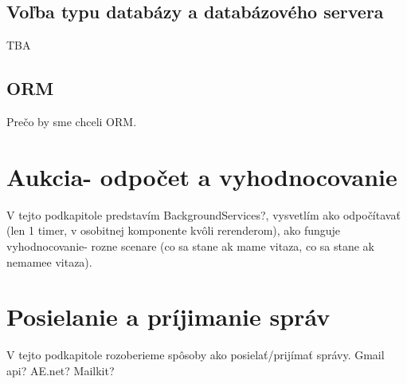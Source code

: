\subsection{Voľba typu databázy a databázového servera}

TBA

\subsection{ORM}

Prečo by sme chceli ORM.

\section{Aukcia- odpočet a vyhodnocovanie}

V tejto podkapitole predstavím BackgroundServices?, vysvetlím ako odpočítavať (len 1 timer, v osobitnej komponente kvôli rerenderom), ako funguje vyhodnocovanie- rozne scenare (co sa stane ak mame vitaza, co sa stane ak nemamee vitaza).

\section{Posielanie a príjimanie správ}

V tejto podkapitole rozoberieme spôsoby ako posielať/prijímať správy. Gmail api? AE.net? Mailkit?
